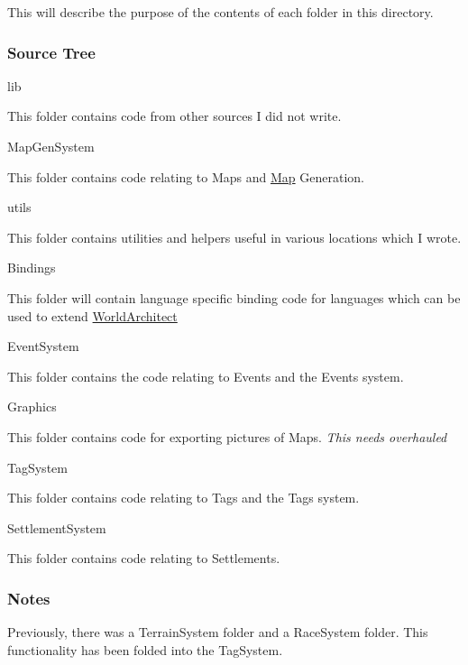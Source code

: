 This will describe the purpose of the contents of each folder in this directory.

\subsubsection*{Source Tree}


\begin{DoxyItemize}
\item lib
\begin{DoxyItemize}
\item This folder contains code from other sources I did not write.
\end{DoxyItemize}
\item Map\+Gen\+System
\begin{DoxyItemize}
\item This folder contains code relating to Maps and \mbox{\hyperlink{class_map}{Map}} Generation.
\end{DoxyItemize}
\item utils
\begin{DoxyItemize}
\item This folder contains utilities and helpers useful in various locations which I wrote.
\end{DoxyItemize}
\item Bindings
\begin{DoxyItemize}
\item This folder will contain language specific binding code for languages which can be used to extend \mbox{\hyperlink{namespace_world_architect}{World\+Architect}}
\end{DoxyItemize}
\item Event\+System
\begin{DoxyItemize}
\item This folder contains the code relating to Events and the Events system.
\end{DoxyItemize}
\item Graphics
\begin{DoxyItemize}
\item This folder contains code for exporting pictures of Maps. {\itshape This needs overhauled}
\end{DoxyItemize}
\item Tag\+System
\begin{DoxyItemize}
\item This folder contains code relating to Tags and the Tags system.
\end{DoxyItemize}
\item Settlement\+System
\begin{DoxyItemize}
\item This folder contains code relating to Settlements.
\end{DoxyItemize}
\end{DoxyItemize}

\subsubsection*{Notes}

Previously, there was a Terrain\+System folder and a Race\+System folder. This functionality has been folded into the Tag\+System. 